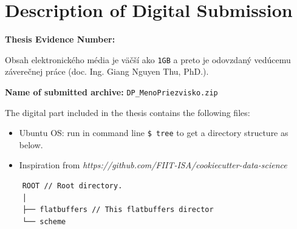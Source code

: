 
\renewcommand*{\thepage}{B-\arabic{page}}



\chapter{Description of Digital Submission \label{cha:cdrom} }

\textbf{Thesis Evidence Number:} \\ \myEvidenceNumber

Obsah elektronického média je väčší ako \texttt{1GB} a preto je odovzdaný vedúcemu záverečnej práce (doc. Ing. Giang Nguyen Thu, PhD.).


\textbf{Name of submitted archive:} \texttt{DP\_MenoPriezvisko.zip}


The digital part included in the thesis contains the following files:
\begin{itemize}
    \item Ubuntu OS: run in command line \texttt{\$ tree} to get a directory structure as below.
    \item Inspiration from \textit{https://github.com/FIIT-ISA/cookiecutter-data-science}
\end{itemize}


\begin{verbatim}
    ROOT // Root directory.
    │
    ├── flatbuffers // This flatbuffers director
    └── scheme
\end{verbatim}

